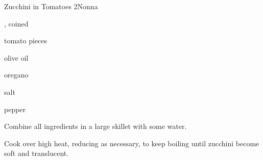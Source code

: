 \begin{recipe}{Zucchini in Tomatoes 2}{Nonna}{}

\begin{ingredients}
\item {}, coined
\item tomato pieces
\item olive oil
\item oregano
\item salt
\item pepper
\end{ingredients}

\begin{directions}
\item Combine all ingredients in a large skillet with some water.
\item Cook over high heat, reducing as necessary, to keep boiling until zucchini become soft and translucent.
\end{directions}

\end{recipe}

